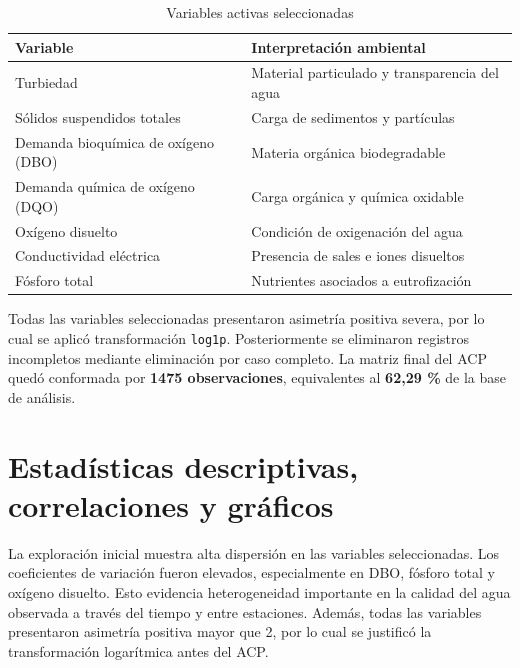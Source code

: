 \documentclass[12pt,letterpaper]{article}
\begin{document}
\begin{table}[H]
\centering
\caption{Variables activas seleccionadas}
\begin{tabular}{p{} p{}}
\toprule
\textbf{Variable} & \textbf{Interpretación ambiental} \\
\midrule
Turbiedad & Material particulado y transparencia del agua \\
Sólidos suspendidos totales & Carga de sedimentos y partículas \\
Demanda bioquímica de oxígeno (DBO) & Materia orgánica biodegradable \\
Demanda química de oxígeno (DQO) & Carga orgánica y química oxidable \\
Oxígeno disuelto & Condición de oxigenación del agua \\
Conductividad eléctrica & Presencia de sales e iones disueltos \\
Fósforo total & Nutrientes asociados a eutrofización \\
\bottomrule
\end{tabular}
\end{table}

Todas las variables seleccionadas presentaron asimetría positiva severa, por lo cual se aplicó transformación \texttt{log1p}. Posteriormente se eliminaron registros incompletos mediante eliminación por caso completo. La matriz final del ACP quedó conformada por \textbf{1475 observaciones}, equivalentes al \textbf{62,29 \%} de la base de análisis.

\section{Estadísticas descriptivas, correlaciones y gráficos}

La exploración inicial muestra alta dispersión en las variables seleccionadas. Los coeficientes de variación fueron elevados, especialmente en DBO, fósforo total y oxígeno disuelto. Esto evidencia heterogeneidad importante en la calidad del agua observada a través del tiempo y entre estaciones. Además, todas las variables presentaron asimetría positiva mayor que 2, por lo cual se justificó la transformación logarítmica antes del ACP.
\end{document}
